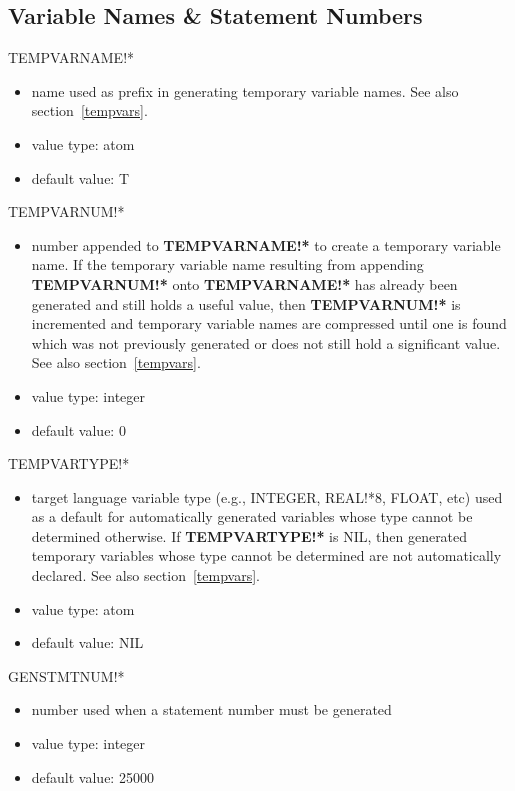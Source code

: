 \subsection{Variable Names \& Statement Numbers}
\begin{describe}{TEMPVARNAME!*}
\begin{itemize}
\item name used as prefix in generating temporary variable names.
See also section~\ref{tempvars}.
\item value type:  atom
\item default value:  T
\end{itemize}
\end{describe}
\begin{describe}{TEMPVARNUM!*}
\begin{itemize}
\item number appended to {\bf TEMPVARNAME!*} to create a temporary variable
name. If the temporary variable name resulting from appending {\bf TEMPVARNUM!*}
onto {\bf TEMPVARNAME!*} has already been generated
and still holds a useful value, then {\bf TEMPVARNUM!*} is incremented
and temporary variable names are compressed until one is found which
was not previously generated or does not still hold a significant value.
See also section~\ref{tempvars}.
\item value type:  integer
\item default value:  0
\end{itemize}
\end{describe}
\begin{describe}{TEMPVARTYPE!*}
\begin{itemize}
\item target language variable type (e.g., INTEGER, REAL!*8, FLOAT, etc) used
as a default for automatically generated variables whose type cannot be
determined otherwise.  If {\bf TEMPVARTYPE!*} is NIL, then generated temporary
variables whose type cannot be determined are not automatically declared.
See also section~\ref{tempvars}.
\item value type:  atom
\item default value:  NIL
\end{itemize}
\end{describe}
\begin{describe}{GENSTMTNUM!*}
\begin{itemize}
\item number used when a statement number must be generated
\item value type:  integer
\item default value:  25000
\end{itemize}
\end{describe}
